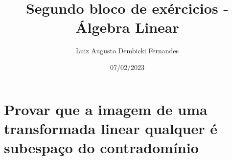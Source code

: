 \documentclass[12pt, twoside, a4]{article} %
\begin{document}
\title{Segundo bloco de exércicios - Álgebra Linear}
\author{Luiz Augusto Dembicki Fernandes}
\date{07/02/2023}
\maketitle

\section{Provar que a imagem de uma transformada linear qualquer é subespaço do contradomínio}
\end{document}
